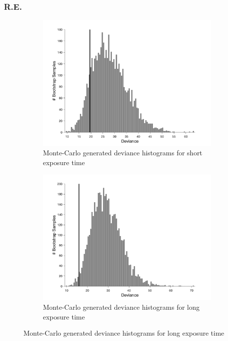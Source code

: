 \documentclass{article}
\begin{document}
\subsubsection*{R.E.}
\begin{figure}[!hb]
    \begin{subfigure}{0.494\textwidth}
        \centering
        \includegraphics[width = \linewidth]{Thesis/plots/gof/segSize/segSize_re_short_bootstrap.png}
        \caption{Monte-Carlo generated deviance histograms for short exposure time}
        \label{fig:da_gof_short_bootstrap}
    \end{subfigure}
    \hspace{0.01\textwidth}
    \begin{subfigure}{0.494\textwidth}
        \centering
        \includegraphics[width = \linewidth]{Thesis/plots/gof/segSize/segSize_re_long_bootstrap.png}
        \caption{Monte-Carlo generated deviance histograms for long exposure time}
        \label{fig:da_gof_long_bootstrap}
    \end{subfigure}
    

\end{figure}
\end{document}
